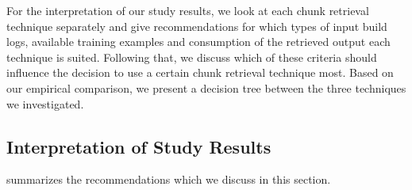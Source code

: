For the interpretation of our study results, we look at each chunk
retrieval technique separately and give recommendations for
which types of input build
logs, available training examples and consumption of the retrieved
output each technique is suited.
Following that, we discuss
which of these criteria should influence the decision to use a certain
chunk retrieval technique most.
Based on our empirical comparison, we present a
decision tree between the three techniques we investigated.

\subsection{Interpretation of Study Results}
 summarizes the
recommendations which we discuss
in this section.

\begin{table}[tbp]
\caption{Recommendations for each of the investigated chunk retrieval
techniques.}
\label{tab:single-technique-recommendations}
\end{table}


